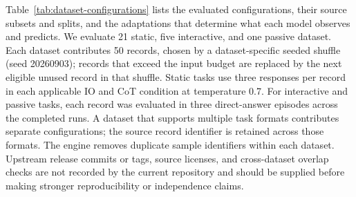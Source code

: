 Table~\ref{tab:dataset-configurations} lists the evaluated configurations, their source subsets and splits, and the adaptations that determine what each model observes and predicts. We evaluate 21 static, five interactive, and one passive dataset. Each dataset contributes 50 records, chosen by a dataset-specific seeded shuffle (seed 20260903); records that exceed the input budget are replaced by the next eligible unused record in that shuffle. Static tasks use three responses per record in each applicable IO and CoT condition at temperature 0.7. For interactive and passive tasks, each record was evaluated in three direct-answer episodes across the completed runs. A dataset that supports multiple task formats contributes separate configurations; the source record identifier is retained across those formats. The engine removes duplicate sample identifiers within each dataset. Upstream release commits or tags, source licenses, and cross-dataset overlap checks are not recorded by the current repository and should be supplied before making stronger reproducibility or independence claims.

